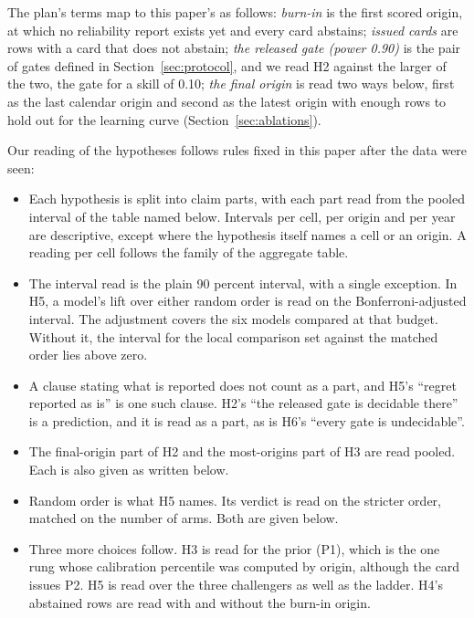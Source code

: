 The plan's terms map to this paper's as follows: \emph{burn-in} is the first scored origin, at which no reliability report exists yet and every card abstains; \emph{issued cards} are rows with a card that does not abstain; \emph{the released gate (power 0.90)} is the pair of gates defined in Section~\ref{sec:protocol}, and we read H2 against the larger of the two, the gate for a skill of 0.10; \emph{the final origin} is read two ways below, first as the last calendar origin and second as the latest origin with enough rows to hold out for the learning curve (Section~\ref{sec:ablations}).

Our reading of the hypotheses follows rules fixed in this paper after the data were seen:
\begin{itemize}
\item Each hypothesis is split into claim parts, with each part read from the pooled interval of the table named below. Intervals per cell, per origin and per year are descriptive, except where the hypothesis itself names a cell or an origin. A reading per cell follows the family of the aggregate table.
\item The interval read is the plain 90 percent interval, with a single exception. In H5, a model's lift over either random order is read on the Bonferroni-adjusted interval. The adjustment covers the six models compared at that budget. Without it, the interval for the local comparison set against the matched order lies above zero.
\item A clause stating what is reported does not count as a part, and H5's ``regret reported as is'' is one such clause. H2's ``the released gate is decidable there'' is a prediction, and it is read as a part, as is H6's ``every gate is undecidable''.
\item The final-origin part of H2 and the most-origins part of H3 are read pooled. Each is also given as written below.
\item Random order is what H5 names. Its verdict is read on the stricter order, matched on the number of arms. Both are given below.
\item Three more choices follow. H3 is read for the prior (P1), which is the one rung whose calibration percentile was computed by origin, although the card issues P2. H5 is read over the three challengers as well as the ladder. H4's abstained rows are read with and without the burn-in origin.
\end{itemize}

